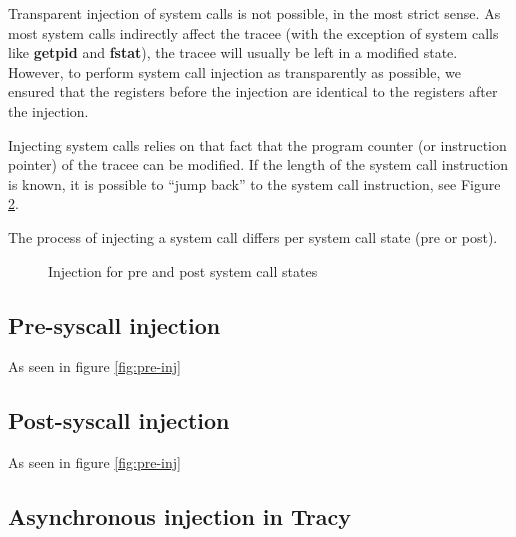 \documentclass[a4paper, 10pt]{report}
\begin{document}
Transparent injection of system calls is not possible, in the most strict sense.
As most system calls indirectly affect the tracee (with the exception of system
calls like \textbf{getpid} and \textbf{fstat}), the tracee will usually
be left in a modified state. However, to perform system call injection as
transparently as possible, we ensured that the registers before the injection
are identical to the registers after the injection.

Injecting system calls relies on that fact that the program counter (or
instruction pointer) of the tracee can be modified. If the length of the system
call instruction is known, it is possible to ``jump back'' to the system call
instruction, see Figure \ref{fig:asm-jump}.


The process of injecting a system call differs per system call state (pre or
post).

\begin{figure}
    \centering
    \hspace{1em}
    \caption{Injection for pre and post system call states}
    \label{fig:injection}
\end{figure}

\begin{figure}
    \caption{} %
    \label{fig:asm-jump}
\end{figure}


\subsection{Pre-syscall injection}

As seen in figure \ref{fig:pre-inj}

\subsection{Post-syscall injection}

As seen in figure \ref{fig:pre-inj}


\subsection{Asynchronous injection in Tracy}
\end{document}
